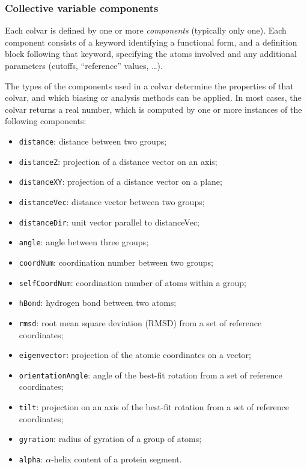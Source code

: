 \subsubsection{Collective variable components}
\label{sec:cvc}

Each colvar is defined by one or more \emph{components} (typically
only one).  Each component consists of a keyword identifying a
functional form, and a definition block following that keyword,
specifying the atoms involved and any additional parameters (cutoffs,
``reference'' values, \ldots).

The types of the components used in a colvar determine the properties
of that colvar, and which biasing or analysis methods can be applied.
In most cases, the colvar returns a real number, which is computed by
one or more instances of the following components:
\begin{itemize}
\item \texttt{distance}: distance between two groups;
\item \texttt{distanceZ}: projection of a distance vector on an axis;
\item \texttt{distanceXY}: projection of a distance vector on a plane;
\item \texttt{distanceVec}: distance vector between two groups;
\item \texttt{distanceDir}: unit vector parallel to distanceVec;
\item \texttt{angle}: angle between three groups;
\item \texttt{coordNum}: coordination number between two groups;
\item \texttt{selfCoordNum}: coordination number of atoms within a
  group;
\item \texttt{hBond}: hydrogen bond between two atoms;
\item \texttt{rmsd}: root mean square deviation (RMSD) from a set of
  reference coordinates;
\item \texttt{eigenvector}: projection of the atomic coordinates on a
  vector;
\item \texttt{orientationAngle}: angle of the best-fit rotation from
  a set of reference coordinates;
\item \texttt{tilt}: projection on an axis of the best-fit rotation
  from a set of reference coordinates;
\item \texttt{gyration}: radius of gyration of a group of atoms;
\item \texttt{alpha}: $\alpha$-helix content of a protein segment.
\end{itemize}


